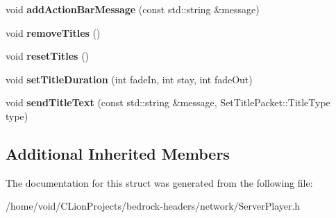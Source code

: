\begin{DoxyCompactItemize}
void {\bfseries add\+Action\+Bar\+Message} (const std\+::string \&message)
\item 
\mbox{\label{struct_server_player_aeaa1e503f1d328fc4e50b3f7dada1ef4}} 
void {\bfseries remove\+Titles} ()
\item 
\mbox{\label{struct_server_player_abffbd59589ca59c1f866feed35097dc5}} 
void {\bfseries reset\+Titles} ()
\item 
\mbox{\label{struct_server_player_a63f8f496ff7a6820fbb904551ae973a2}} 
void {\bfseries set\+Title\+Duration} (int fade\+In, int stay, int fade\+Out)
\item 
\mbox{\label{struct_server_player_a28130e13fdaa7cc5606578fff0f9aa17}} 
void {\bfseries send\+Title\+Text} (const std\+::string \&message, Set\+Title\+Packet\+::\+Title\+Type type)
\end{DoxyCompactItemize}
\subsection*{Additional Inherited Members}


The documentation for this struct was generated from the following file\+:\begin{DoxyCompactItemize}
\item 
/home/void/\+C\+Lion\+Projects/bedrock-\/headers/network/Server\+Player.\+h\end{DoxyCompactItemize}
